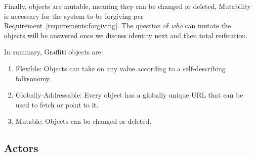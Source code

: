 Finally, objects are mutable, meaning they can be changed or deleted,
Mutability is necessary for the system to be forgiving per Requirement~\ref{requirements:forgiving}.
The question of \emph{who} can mutate the objects
will be answered once we discuss identity next and then total reification.

In summary, Graffiti objects are:

\begin{enumerate}
\item
Flexible: Objects can take on any value according to a self-describing folksonomy.
\item
Globally-Addressable: Every object has a globally unique URL that can be used to fetch or point to it.
\item
Mutable: Objects can be changed or deleted.
\end{enumerate}


\subsection{Actors}
\label{concepts:actors}

